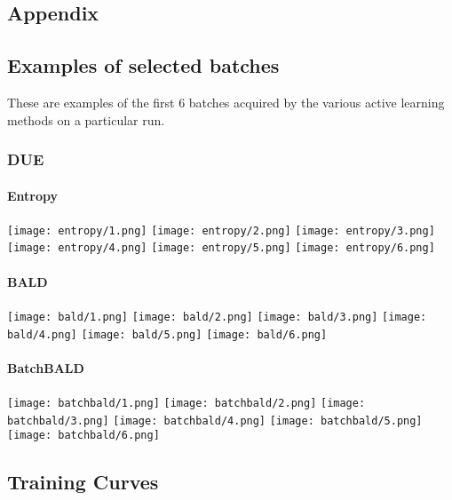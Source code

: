 \documentclass[12pt, a4paper]{report}
\theoremstyle{definition}
\theoremstyle{definition}
\theoremstyle{definition}
\begin{document}
\begin{appendices}
\chapter{Appendix}

\section{Examples of selected batches}
\label{sec:Batches}

These are examples of the first 6 batches acquired by the various active learning methods on a particular run.

\subsection{DUE}

\subsubsection{Entropy}
\texttt{[image: entropy/1.png]}
\texttt{[image: entropy/2.png]}
\texttt{[image: entropy/3.png]}
\texttt{[image: entropy/4.png]}
\texttt{[image: entropy/5.png]}
\texttt{[image: entropy/6.png]}


\subsubsection{BALD}
\texttt{[image: bald/1.png]}
\texttt{[image: bald/2.png]}
\texttt{[image: bald/3.png]}
\texttt{[image: bald/4.png]}
\texttt{[image: bald/5.png]}
\texttt{[image: bald/6.png]}

\subsubsection{BatchBALD}
\texttt{[image: batchbald/1.png]}
\texttt{[image: batchbald/2.png]}
\texttt{[image: batchbald/3.png]}
\texttt{[image: batchbald/4.png]}
\texttt{[image: batchbald/5.png]}
\texttt{[image: batchbald/6.png]}

\section{Training Curves}


\end{appendices}
\end{document}
